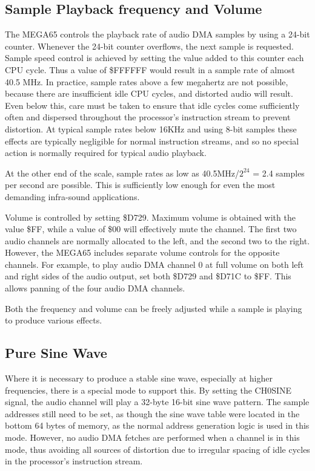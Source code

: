 \subsection{Sample Playback frequency and Volume}

The MEGA65 controls the playback rate of audio DMA samples by using a
24-bit counter.  Whenever the 24-bit counter overflows, the next
sample is requested. Sample speed control is achieved by setting the
value added to this counter each CPU cycle.  Thus a value of
\$FFFFFF would result in a sample rate of almost 40.5 MHz.  In
practice, sample rates above a few megahertz are not possible, because
there are insufficient idle CPU cycles, and distorted audio will
result.  Even below this, care must be taken to ensure that idle
cycles come sufficiently often and dispersed throughout the
processor's instruction stream to prevent distortion.  At typical
sample rates below 16KHz and using 8-bit samples these effects are
typically negligible for normal instruction streams, and so no special
action is normally required for typical audio playback.

At the other end of the scale, sample rates as low as 40.5MHz/$2^{24}$
= 2.4 samples per second are possible.  This is sufficiently low
enough for even the most demanding infra-sound applications.

Volume is controlled by setting \$D729.  Maximum volume is obtained
with the value \$FF, while a value of \$00 will effectively mute the
channel.  The first two audio channels are normally allocated to the
left, and the second two to the right.  However, the MEGA65 includes
separate volume controls for the opposite channels. For example, to
play audio DMA channel 0 at full volume on both left and right sides
of the audio output, set both \$D729 and \$D71C to \$FF.  This allows
panning of the four audio DMA channels.

Both the frequency and volume can be freely adjusted while a sample is playing
to produce various effects.

\subsection{Pure Sine Wave}

Where it is necessary to produce a stable sine wave, especially at
higher frequencies,
there is a special mode to support this. By setting the CH0SINE
signal, the audio channel will play a 32-byte 16-bit sine wave
pattern.  The sample addresses still need to be set, as though the
sine wave table were located in the bottom 64 bytes of memory, as the
normal address generation logic is used in this mode. However, no
audio DMA fetches are performed when a channel is in this mode, thus
avoiding all sources of distortion due to irregular spacing of idle
cycles in the processor's instruction stream.

